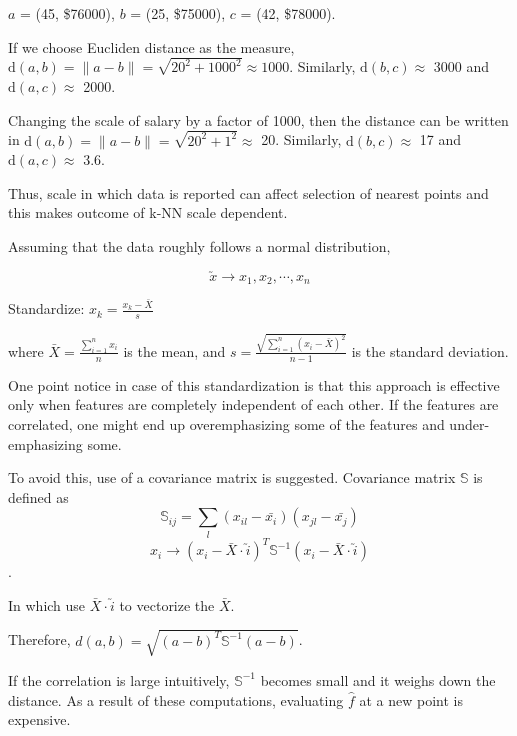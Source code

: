 \documentclass{article}
\begin{document}
{{{            $a$ = (45, \$76000), $b$ = (25, \$75000), $c$ = (42, \$78000). 

            If we choose Eucliden distance as the measure, \(\mathrm{d}(a, b) = \|a - b\| = \sqrt{\mathrm{20^2} + \mathrm{1000^2}} \approx 1000\). Similarly, $\mathrm{d}(b,c) \approx$ 3000 and $\mathrm{d}(a,c) \approx$ 2000.

            Changing the scale of salary by a factor of 1000, then the distance can be written in $\mathrm{d}(a, b) = \|a - b\| = \sqrt{\mathrm{20}^2 + \mathrm{1}^2} \approx$ 20. Similarly, $\mathrm{d}(b,c) \approx$ 17 and $\mathrm{d}(a, c) \approx$ 3.6.

            Thus, scale in which data is reported can affect selection of nearest points and this makes outcome of k-NN scale dependent. 
        }
        Assuming that the data roughly follows a normal distribution, 

        \[\utilde{x} \rightarrow x_1, x_2,\cdots,x_n\] 

        Standardize: \(x_k = \frac{x_k - \bar{X}}{s}\) 

        where \(\bar{X} =\frac{\sum_{i=1}^{n}x_i}{n}\) is the mean, and \(s = \frac{\sqrt{\sum_{i=1}^{n}(x_i - \bar{X})^2}}{n-1}\) is the standard deviation.

        One point notice in case of this standardization is that this approach is effective only when features are completely independent of each other. If the features are correlated, one might end up overemphasizing some of the features and under-emphasizing some. 

        To avoid this, use of a covariance matrix is suggested. Covariance matrix $\mathbb{S}$ is defined as \[\mathbb{S}_{ij} = \sum_l(x_{il} - \bar{x_i})(x_{jl} - \bar{x_j})\]
        \[x_i \rightarrow (x_i - \bar{X}\cdot \utilde{i})^T\mathbb{S}^{-1} (x_i - \bar{X}\cdot \utilde{i})\]. 

        In which use \(\bar{X}\cdot \utilde{i}\) to vectorize the \(\bar{X}\).

        Therefore, \(d(a, b) = \sqrt{(a - b)^T \mathbb{S}^{-1}(a - b)}\). 

        If the correlation is large intuitively, \(\mathbb{S}^{-1}\) becomes small and it weighs down the distance. As a result of these computations, evaluating \(\hat{f}\) at a new point is expensive.
    }
}
\end{document}

